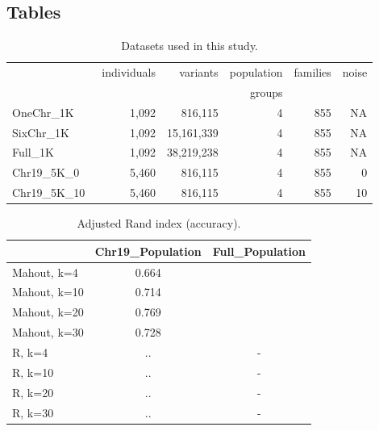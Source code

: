 \documentclass[twocolumn]{bmcart}%
\newcommand{\chrOnePop}{Chr19\_Population}
\newcommand{\FullPop}{Full\_Population}
\newcommand{\OneReal}{OneChr\_1K}
\newcommand{\SixReal}{SixChr\_1K}
\newcommand{\FullReal}{Full\_1K}
\newcommand{\SixArtiExact}{Chr19\_5K\_0}
\newcommand{\SixArtiNoise}{Chr19\_5K\_10}
\begin{document}
\begin{backmatter}

\section*{Tables}
\begin{table}[h!]
\caption{Datasets used in this study.}
      \begin{tabular}{lrrrrr}
        \hline
           & individuals  & variants  & population & families & noise\\ 
           & & &groups&& \\ \hline
        \OneReal & 1,092 & 816,115  & 4 & 855 & NA\\
        \SixReal & 1,092 & 15,161,339 & 4 & 855 & NA\\
        \FullReal\ & 1,092 & 38,219,238 & 4 & 855 & NA\\
	\SixArtiExact\ & 5,460 & 816,115 & 4 & 855 & 0 \\ 
	\SixArtiNoise\ & 5,460 & 816,115 & 4 & 855 & 10 \\ 
      \end{tabular}
      \label{datasets}
\end{table}


\begin{table}[h!]
\caption{Adjusted Rand index (accuracy).}
      \begin{tabular}{lcc}
        \hline
           & \chrOnePop & \FullPop   \\ \hline
        Mahout, k=4 & 0.664\\
        Mahout, k=10 & 0.714 \\
        Mahout, k=20 & 0.769 \\ 
        Mahout, k=30 & 0.728  \\ 
        R, k=4 & .. & - \\
        R, k=10 & .. & - \\
        R, k=20 & .. & - \\ 
        R, k=30 & .. & - \\ \hline
      \end{tabular}
      \label{datasetsAcc}
\end{table}


\end{backmatter}
\end{document}
